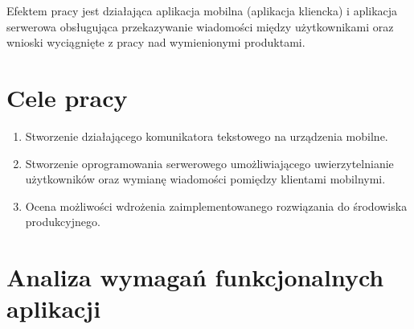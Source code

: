 \documentclass[../main.tex]{subfiles}
\begin{document}
Efektem pracy jest działająca aplikacja mobilna (aplikacja kliencka) i aplikacja serwerowa obsługująca przekazywanie wiadomości między użytkownikami oraz wnioski wyciągnięte z pracy nad wymienionymi produktami.
\vfill

\section{Cele pracy}\label{sec:goals_of_the_publication}
\begin{enumerate}
	\item Stworzenie działającego komunikatora tekstowego na urządzenia mobilne.
	\item Stworzenie oprogramowania serwerowego umożliwiającego uwierzytelnianie użytkowników oraz wymianę wiadomości pomiędzy klientami mobilnymi.
	\item Ocena możliwości wdrożenia zaimplementowanego rozwiązania do środowiska produkcyjnego.
\end{enumerate}

\section{Analiza wymagań funkcjonalnych aplikacji}
\end{document}

